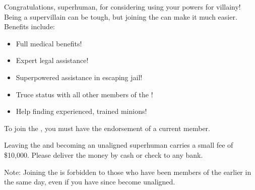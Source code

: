 \documentclass[white]{guildcamp1}
\begin{document}
\name{\wVillainRecruitment{}}

Congratulations, superhuman, for considering using your powers for villainy!  Being a supervillain can be tough, but joining the \cVillainCompact{\intro} can make it much easier.  Benefits include:

\begin{itemize}
\item Full medical benefits!
\item Expert legal assistance!
\item Superpowered assistance in escaping jail!
\item Truce status with all other members of the \cVillainCompact{}!
\item Help finding experienced, trained minions!
\end{itemize}

To join the \cVillainCompact{}, you must have the endorsement of a current \cVillainCompact{} member.

Leaving the \cVillainCompact{\intro} and becoming an unaligned superhuman carries a small fee of \$10,000.  Please deliver the money by cash or check to any bank.  %

Note: Joining the \cVillainCompact{} is forbidden to those who have been members of the \cHeroLeague{\intro} earlier in the same day, even if you have since become unaligned.
\end{document}
